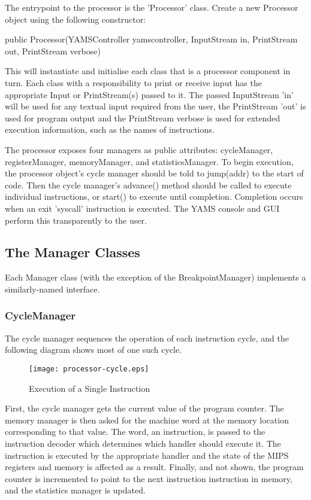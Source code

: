 The entrypoint to the processor is the 'Processor' class. Create a new Processor object using the following constructor:

public Processor(YAMSController yamscontroller, InputStream in, PrintStream out, PrintStream verbose)

This will instantiate and initialise each class that is a processor component in turn. Each class with a responsibility to print or receive input has the appropriate Input or PrintStream(s) passed to it. 
The passed InputStream 'in' will be used for any textual input required from the user, the PrintStream 'out' is used for program output and the PrintStream verbose is used for extended execution information, such as the names of instructions.

The processor exposes four managers as public attributes: cycleManager, registerManager, memoryManager, and statisticsManager.
To begin execution, the processor object's cycle manager should be told to jump(addr) to the start of code. Then the cycle manager's advance() method should be called to execute individual instructions, or start() to execute until completion. Completion occurs when an exit 'syscall' instruction is executed.
The YAMS console and GUI perform this transparently to the user.


\subsection{The Manager Classes}

Each Manager class (with the exception of the BreakpointManager) implements a similarly-named interface.

\subsubsection{CycleManager}

The cycle manager sequences the operation of each instruction cycle, and the following diagram shows most of one such cycle.


\begin{figure}
\begin{center}
\texttt{[image: processor-cycle.eps]}
\caption{Execution of a Single Instruction}
\end{center}
\end{figure}


First, the cycle manager gets the current value of the program counter. The memory manager is then asked for the machine word at the memory location corresponding to that value. The word, an instruction, is passed to the instruction decoder which determines which handler should execute it. The instruction is executed by the appropriate handler and the state of the MIPS registers and memory is affected as a result. Finally, and not shown, the program counter is incremented to point to the next instruction instruction in memory, and the statistics manager is updated.

